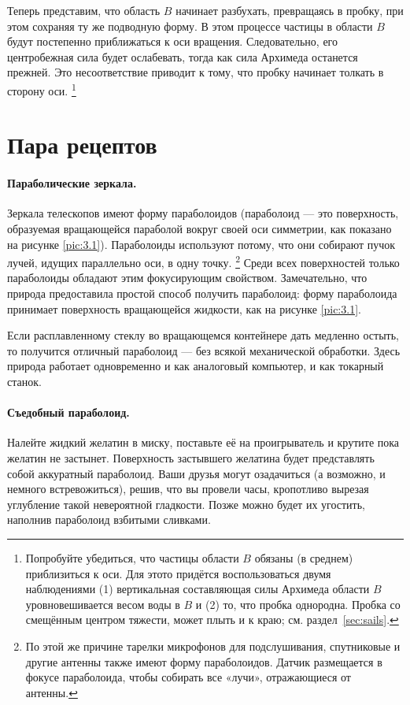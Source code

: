 Теперь представим, что область $B$ начинает разбухать, превращаясь в пробку, при этом сохраняя ту же подводную форму.
В этом процессе частицы в области $B$ будут постепенно приближаться к оси вращения.
Следовательно, его центробежная сила будет ослабевать, тогда как сила Архимеда останется прежней.
Это несоответствие приводит к тому, что пробку начинает толкать в сторону оси.%
\footnote{Попробуйте убедиться, что частицы области $B$ обязаны (в среднем) приблизиться к оси.
Для этото придётся воспользоваться двумя наблюдениями
(1) вертикальная составляющая силы Архимеда области $B$ уровновешивается весом воды в $B$ и
(2) то, что пробка однородна.
Пробка со смещённым центром тяжести, может плыть и к краю;
см. раздел~\ref{sec:sails}.
\pr}

\section{Пара рецептов}\label{Пара рецептов}

\paragraph{Параболические зеркала.}
Зеркала телескопов имеют форму параболоидов (параболоид --- это поверхность, образуемая вращающейся параболой вокруг своей оси симметрии, как показано на рисунке \ref{pic:3.1}).
Параболоиды используют потому, что они собирают пучок лучей, идущих параллельно оси, в одну точку.%
\footnote{По этой же причине тарелки микрофонов для подслушивания, спутниковые и другие антенны также имеют форму параболоидов.
Датчик размещается в фокусе параболоида, чтобы собирать все «лучи», отражающиеся от антенны.}
Среди всех поверхностей только параболоиды обладают этим фокусирующим свойством.
Замечательно, что природа предоставила простой способ получить параболоид: форму параболоида принимает поверхность вращающейся жидкости, как на рисунке \ref{pic:3.1}.

Если расплавленному стеклу во вращающемся контейнере дать медленно остыть, то получится отличный параболоид --- без всякой механической обработки.
Здесь природа работает одновременно и как аналоговый компьютер, и как токарный станок.

\paragraph{Съедобный параболоид.}
Налейте жидкий желатин в миску, поставьте её на проигрыватель и крутите пока желатин не застынет.
Поверхность застывшего желатина будет представлять собой аккуратный параболоид.
Ваши друзья могут озадачиться (а возможно, и немного встревожиться), решив, что вы провели часы, кропотливо вырезая углубление такой невероятной гладкости.
Позже можно будет их угостить, наполнив параболоид взбитыми сливками.

